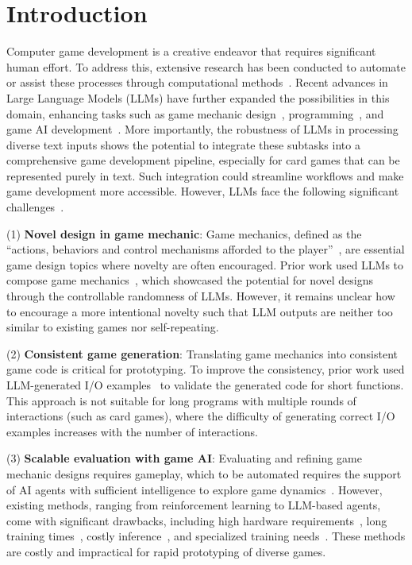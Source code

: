 \section{Introduction}

Computer game development is a creative endeavor that requires significant human effort. To address this, extensive research has been conducted to automate or assist these processes through computational methods~\cite{Gallotta_2024}. Recent advances in Large Language Models (LLMs) have further expanded the possibilities in this domain, enhancing tasks such as game mechanic design~\cite{charity2023conceptualgame}, programming~\cite{wu2024instructiondriven,chatdev}, and game AI development~\cite{yao_react_2023}. More importantly, the robustness of LLMs in processing diverse text inputs shows the potential to integrate these subtasks into a comprehensive game development pipeline, especially for card games that can be represented purely in text. Such integration could streamline workflows and make game development more accessible.
However, LLMs face the following significant challenges~\cite{Gallotta_2024}.

(1) \textbf{Novel design in game mechanic}: 
Game mechanics, defined as the ``actions, behaviors and control mechanisms afforded to the player''~\cite{mda}, are essential game design topics where novelty are often encouraged. 
Prior work used LLMs to compose game mechanics~\cite{charity2023conceptualgame}, which showcased the potential for novel designs through the controllable randomness of LLMs. However, it remains unclear how to encourage a more intentional novelty such that LLM outputs are neither too similar to existing games nor self-repeating.


(2) \textbf{Consistent game generation}: 
Translating game mechanics into consistent game code is critical for prototyping. To improve the consistency, prior work used LLM-generated I/O examples~\cite{liu2023is} to validate the generated code for short functions. This approach is not suitable for long programs with multiple rounds of interactions (such as card games), where the difficulty of generating correct I/O examples increases with the number of interactions.

(3) \textbf{Scalable evaluation with game AI}: 
Evaluating and refining game mechanic designs requires gameplay, which to be automated requires the support of AI agents with sufficient intelligence to explore game dynamics~\cite{Isaksen2015ExploringGS}. However, existing methods, ranging from reinforcement learning to LLM-based agents, come with significant drawbacks, including high hardware requirements~\cite{ma_eureka_2023}, long training times~\cite{shinn_reflexion_2023}, costly inference~\cite{wang2023avalon}, and specialized training needs~\cite{light2024strategist}. These methods are costly and impractical for rapid prototyping of diverse games.


